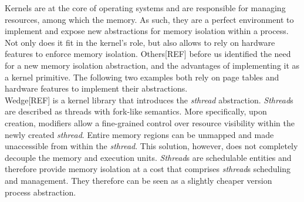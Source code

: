 \documentclass[letterpaper,twocolumn,10pt]{article}
\begin{document}
Kernels are at the core of operating systems and are responsible for managing resources, among which the memory.
As such, they are a perfect environment to implement and expose new abstractions for memory isolation within a process.
Not only does it fit in the kernel's role, but also allows to rely on hardware features to enforce memory isolation.
Others[REF] before us identified the need for a new memory isolation abstraction, and the advantages of implementing it as a kernel primitive.
The following two examples both rely on page tables and hardware features to implement their abstractions. \\

Wedge[REF] is a kernel library that introduces the \emph{sthread} abstraction.
\emph{Sthread}s are described as threads with fork-like semantics.
More specifically, upon creation, modifiers allow a fine-grained control over resource visibility within the newly created \emph{sthread}.
Entire memory regions can be unmapped and made unaccessible from within the \emph{sthread}.
This solution, however, does not completely decouple the memory and execution units.
\emph{Sthread}s are schedulable entities and therefore provide memory isolation at a cost that comprises \emph{sthread}s scheduling and management.
They therefore can be seen as a slightly cheaper version process abstraction.\\
\end{document}
